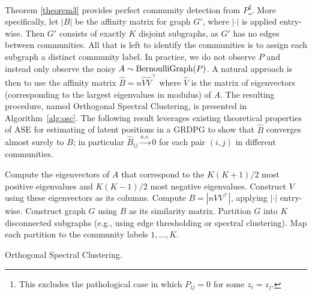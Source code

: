 \documentclass[12pt]{article}
\begin{document}
Theorem \ref{theorem3} provides perfect community detection from \(P\)\footnote{This excludes the pathological case in which $P_{ij} = 0$ for some $z_i = z_j$.}.
More specifically, let \(|B|\) be the affinity matrix for graph \(G'\), 
where $|\cdot|$ is applied entry-wise. Then
\(G'\) consists of exactly \(K\) disjoint subgraphs, 
as $G'$ has no edges between communities. 
All that is left to identify the communities is 
to assign each subgraph a distinct community label. 
In practice, we do not observe $P$ and instead only observe the noisy
$A \sim \mathrm{BernoulliGraph}(P)$. A natural approach is then to use
the affinity matrix $\hat{B} = n \hat{V} \hat{V}^{\top}$ where
$\hat{V}$ is the matrix of eigenvectors (corresponding to the largest
eigenvalues in modulus) of $A$. The resulting procedure, named
Orthogonal Spectral Clustering, is presented in
Algorithm~\ref{alg:osc}.
The following result leverages existing theoretical properties
of ASE for estimating of latent positions in a GRDPG \citep{rubindelanchy2017statistical} to show that
$\hat{B}$ converges almost surely to $B$; in particular 
 $\hat{B}_{ij} \stackrel{a.s.}{\to} 0$ 
for each pair $(i, j)$ in different communities. 

\begin{algorithm}[tp]
  \label{alg:osc}
  \DontPrintSemicolon
  \SetAlgoLined
    Compute the eigenvectors of $A$ that correspond to the $K (K+1) / 2$ most
    positive eigenvalues and $K (K-1) / 2$ most negative eigenvalues. Construct
    $V$ using these eigenvectors as its columns.\;
    Compute $B = |n V V^\top|$, applying $|\cdot|$ entry-wise.\;
    Construct graph $G$ using $B$ as its similarity matrix.\;
    Partition $G$ into $K$ disconnected subgraphs
    (e.g., using edge thresholding or spectral clustering).\;
    Map each partition to the community labels $1, ..., K$.\;
  \caption{Orthogonal Spectral Clustering.}
\end{algorithm}

\end{document}
